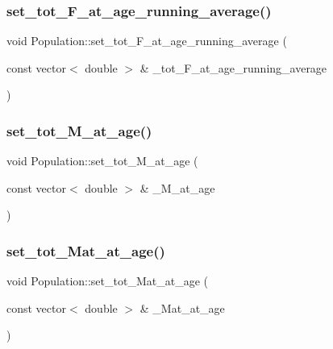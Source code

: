 \mbox{\label{class_population_a55a897b6756a38aa2f8ec28a308653f4}} 
\subsubsection{\texorpdfstring{set\_tot\_F\_at\_age\_running\_average()}{set\_tot\_F\_at\_age\_running\_average()}}
{\footnotesize\ttfamily void Population\+::set\+\_\+tot\+\_\+\+F\+\_\+at\+\_\+age\+\_\+running\+\_\+average (\begin{DoxyParamCaption}\item[{const vector$<$ double $>$ \&}]{\+\_\+tot\+\_\+\+F\+\_\+at\+\_\+age\+\_\+running\+\_\+average }\end{DoxyParamCaption})}

\mbox{\label{class_population_af83edcec617cc363dad6ff33cafda0e6}} 
\subsubsection{\texorpdfstring{set\_tot\_M\_at\_age()}{set\_tot\_M\_at\_age()}}
{\footnotesize\ttfamily void Population\+::set\+\_\+tot\+\_\+\+M\+\_\+at\+\_\+age (\begin{DoxyParamCaption}\item[{const vector$<$ double $>$ \&}]{\+\_\+\+M\+\_\+at\+\_\+age }\end{DoxyParamCaption})}

\mbox{\label{class_population_a41c03a9d39741527eb2cf6bfd6d96b99}} 
\subsubsection{\texorpdfstring{set\_tot\_Mat\_at\_age()}{set\_tot\_Mat\_at\_age()}}
{\footnotesize\ttfamily void Population\+::set\+\_\+tot\+\_\+\+Mat\+\_\+at\+\_\+age (\begin{DoxyParamCaption}\item[{const vector$<$ double $>$ \&}]{\+\_\+\+Mat\+\_\+at\+\_\+age }\end{DoxyParamCaption})}

